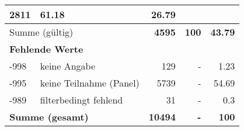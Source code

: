 \begin{longtable}{lXrrr}
       \num{2811} &
       \num[round-mode=places,round-precision=2]{61.18} &
         \num[round-mode=places,round-precision=2]{26.79} \\
     \midrule
     \multicolumn{2}{l}{Summe (gültig)} &
       \textbf{\num{4595}} &
     \textbf{\num{100}} &
       \textbf{\num[round-mode=places,round-precision=2]{43.79}} \\
     \multicolumn{5}{l}{\textbf{Fehlende Werte}}\\
       -998 &
       keine Angabe &
         \num{129} &
        - &
         \num[round-mode=places,round-precision=2]{1.23} \\
       -995 &
       keine Teilnahme (Panel) &
         \num{5739} &
        - &
         \num[round-mode=places,round-precision=2]{54.69} \\
       -989 &
       filterbedingt fehlend &
         \num{31} &
        - &
         \num[round-mode=places,round-precision=2]{0.3} \\
     \midrule
     \multicolumn{2}{l}{\textbf{Summe (gesamt)}} &
          \textbf{\num{10494}} &
        \textbf{-} &
        \textbf{\num{100}} \\
     \bottomrule
     \end{longtable}
     
